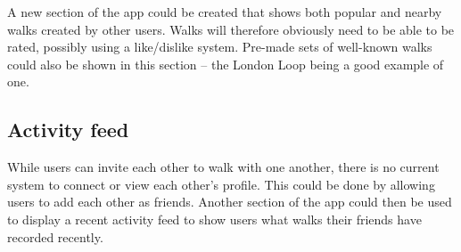 A new section of the app could be created that shows both popular and nearby walks created by other users. Walks will therefore obviously need to be able to be rated, possibly using a like/dislike system. Pre-made sets of well-known walks could also be shown in this section -- the London Loop being a good example of one.

\subsection{Activity feed}

While users can invite each other to walk with one another, there is no current system to connect or view each other's profile. This could be done by allowing users to add each other as friends. Another section of the app could then be used to display a recent activity feed to show users what walks their friends have recorded recently.


